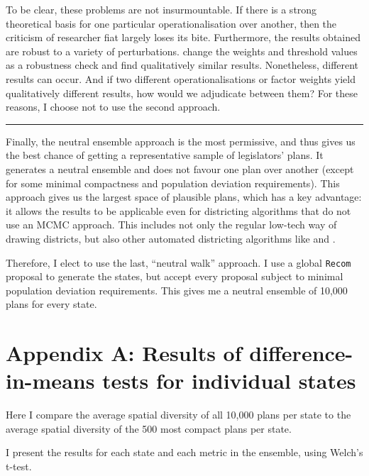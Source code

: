 \documentclass[]{article}
\begin{document}
To be clear, these problems are not insurmountable. If there is a strong
theoretical basis for one particular operationalisation over another,
then the criticism of researcher fiat largely loses its bite.
Furthermore, the results obtained are robust to a variety of
perturbations. \cite{h2018} change the weights and threshold values as a
robustness check and find qualitatively similar results. Nonetheless,
different results can occur. And if two different operationalisations or
factor weights yield qualitatively different results, how would we
adjudicate between them? For these reasons, I choose not to use the
second approach.

\begin{center}\rule{0.5\linewidth}{\linethickness}\end{center}

Finally, the neutral ensemble approach is the most permissive, and thus
gives us the best chance of getting a representative sample of
legislators' plans. It generates a neutral ensemble and does not favour
one plan over another (except for some minimal compactness and
population deviation requirements). This approach gives us the largest
space of plausible plans, which has a key advantage: it allows the
results to be applicable even for districting algorithms that do not use
an MCMC approach. This includes not only the regular low-tech way of
drawing districts, but also other automated districting algorithms like
\cite{mm2018} and \cite{lf2019}.

Therefore, I elect to use the last, ``neutral walk'' approach. I use a
global \texttt{Recom} proposal to generate the states, but accept every
proposal subject to minimal population deviation requirements. This
gives me a neutral ensemble of 10,000 plans for every state.

\hypertarget{appendix-a-results-of-difference-in-means-tests-for-individual-states}{%
\section{Appendix A: Results of difference-in-means tests for individual
states}\label{appendix-a-results-of-difference-in-means-tests-for-individual-states}}

Here I compare the average spatial diversity of all 10,000 plans per
state to the average spatial diversity of the 500 most compact plans per
state.

I present the results for each state and each metric in the ensemble,
using Welch's t-test.
\end{document}
